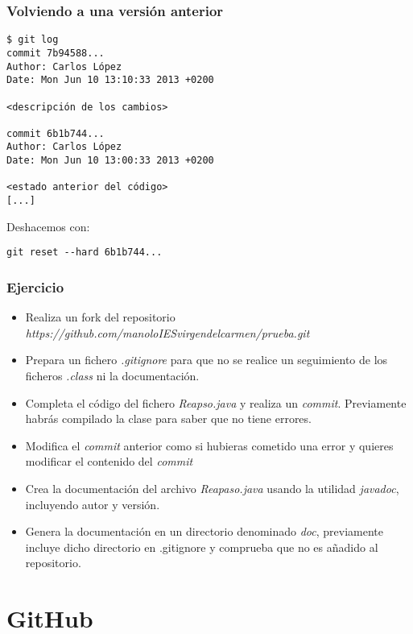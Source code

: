 \documentclass{beamer}
\begin{document}
\begin{frame}[fragile]
\frametitle{Volviendo a una versión anterior}
\begin{verbatim}
$ git log
commit 7b94588...
Author: Carlos López
Date: Mon Jun 10 13:10:33 2013 +0200

<descripción de los cambios>

commit 6b1b744...
Author: Carlos López
Date: Mon Jun 10 13:00:33 2013 +0200

<estado anterior del código>
[...]
\end{verbatim}
Deshacemos con:
\begin{verbatim}
git reset --hard 6b1b744...
\end{verbatim}
\end{frame}

\begin{frame}[fragile]
\frametitle{Ejercicio}
\begin{itemize}[<+->]
\item Realiza un fork del repositorio \emph{https://github.com/manoloIESvirgendelcarmen/prueba.git}
\item Prepara un fichero \emph{.gitignore} para que no se realice un seguimiento de los ficheros \emph{.class} ni la documentación.
\item Completa el código del fichero \emph{Reapso.java} y realiza un \emph{commit}. Previamente habrás compilado la clase para saber que no tiene errores.
\item Modifica el \emph{commit} anterior como si hubieras cometido una error y quieres modificar el contenido del \emph{commit}
\item Crea la documentación del archivo \emph{Reapaso.java} usando la utilidad \emph{javadoc}, incluyendo autor y versión.
\item Genera la documentación en un directorio denominado \emph{doc}, previamente incluye dicho directorio en .gitignore y comprueba que no es añadido al repositorio.
\end{itemize}
\end{frame}


\section{GitHub}
\end{document}
